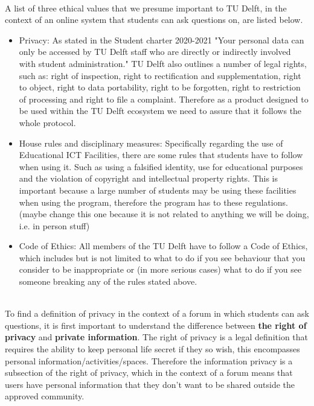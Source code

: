 \documentclass{article}
\begin{document}
\\A list of three ethical values that we presume important to TU Delft, in the context of an online system that students can ask questions on, are listed below. 
\begin{itemize}
    \item Privacy:  As stated in the Student charter 2020-2021 "Your personal data can only be accessed by TU Delft staff who are directly or indirectly involved with student administration."\citep{TUDelftMan} TU Delft also outlines a number of legal rights, such as: right of inspection, right to rectification and supplementation, right to object, right to data portability, right to be forgotten, right to restriction of processing and right to file a complaint. Therefore as a product designed to be used within the TU Delft ecosystem we need to assure that it follows the whole protocol.
    \item House rules and disciplinary measures: Specifically regarding the use of Educational ICT Facilities, there are some rules that students have to follow when using it. Such as using a falsified identity, use for educational purposes and  the violation of copyright and intellectual property rights. This is important because a large number of students may be using these facilities when using the program, therefore the program has to these regulations.  \citep{TUDelftICT} (maybe change this one because it is not related to anything we will be doing, i.e. in person stuff) 
    \item Code of Ethics: All members of the TU Delft have to follow a Code of Ethics, which includes but is not limited to what to do if you see behaviour that you consider to be inappropriate or (in more serious cases) what to do if you see someone breaking any of the rules stated above. \citep{TUDelftMan}
\end{itemize}

\\ To find a definition of privacy in the context of a forum in which students can ask questions, it is first important to understand the difference between \textbf{the right of privacy} and \textbf{private information}. The right of privacy is a legal definition that requires the ability to keep personal life secret if they so wish, this encompasses  personal information/activities/spaces. Therefore the information privacy is a subsection of the right of privacy, which in the context of a forum means that users have personal information that they don't want to be shared outside the approved community. \citep{PrivacyComputing}\\
\end{document}
